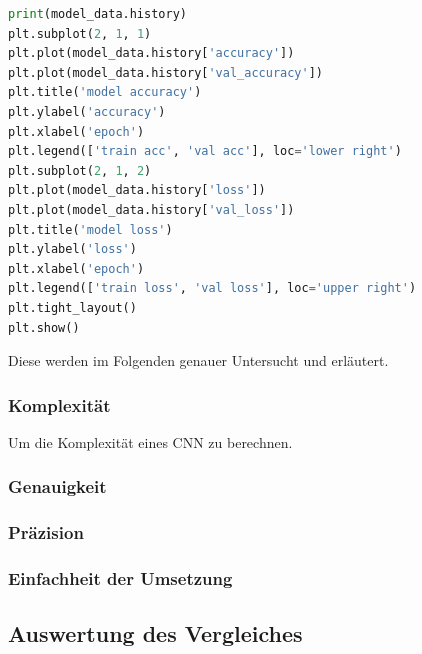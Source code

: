 \begin{minipage}{\textwidth}
	\begin{lstlisting}[language=Python, caption=Pythoncode zum Darstellen der Daten, label=lst:test_plot_cnn]
print(model_data.history)
plt.subplot(2, 1, 1)
plt.plot(model_data.history['accuracy'])
plt.plot(model_data.history['val_accuracy'])
plt.title('model accuracy')
plt.ylabel('accuracy')
plt.xlabel('epoch')
plt.legend(['train acc', 'val acc'], loc='lower right')
plt.subplot(2, 1, 2)
plt.plot(model_data.history['loss'])
plt.plot(model_data.history['val_loss'])
plt.title('model loss')
plt.ylabel('loss')
plt.xlabel('epoch')
plt.legend(['train loss', 'val loss'], loc='upper right')
plt.tight_layout()
plt.show()
	\end{lstlisting}
\end{minipage}

Diese werden im Folgenden genauer Untersucht und erläutert.

\subsubsection{Komplexität}
Um die Komplexität eines CNN zu berechnen.

\subsubsection{Genauigkeit}

\subsubsection{Präzision}

\subsubsection{Einfachheit der Umsetzung}

\subsection{Auswertung des Vergleiches}
